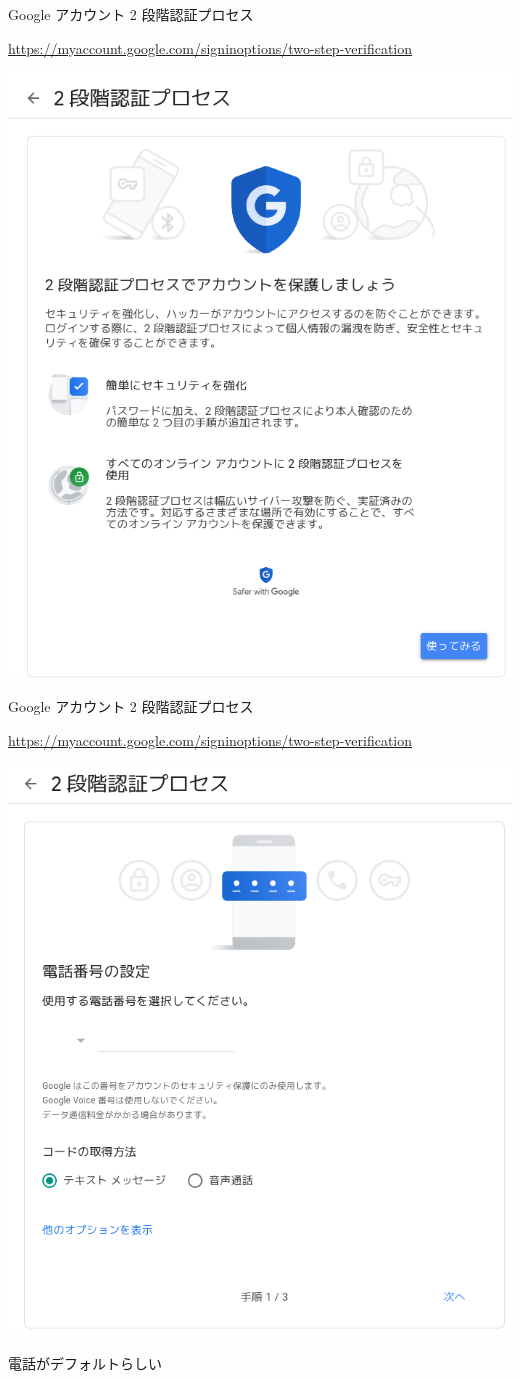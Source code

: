 \begin{frame}{Google アカウント 2 段階認証プロセス}

{\footnotesize\url{https://myaccount.google.com/signinoptions/two-step-verification}}

\begin{center}
\includegraphics[width=0.5\hsize]{image202205/g-signinopt-twostepverif-welcome.png}
\end{center}

\begin{quote}
\end{quote}

\end{frame}

\begin{frame}{Google アカウント 2 段階認証プロセス}

{\footnotesize\url{https://myaccount.google.com/signinoptions/two-step-verification}}

\begin{center}
\includegraphics[width=0.45\hsize]{image202205/g-signinopt-twostepverif-enroll-1-0.png}
\end{center}

電話がデフォルトらしい

\end{frame}

